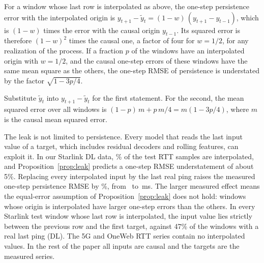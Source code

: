 \begin{proposition}
\label{prop:leak}
For a window whose last row is interpolated as above, the one-step persistence error with the interpolated origin is $y_{t+1}-\tilde{y}_t=(1-w)\,(y_{t+1}-y_{t-1})$, which is $(1-w)$ times the error with the causal origin $y_{t-1}$. Its squared error is therefore $(1-w)^2$ times the causal one, a factor of four for $w=1/2$, for any realization of the process. If a fraction $p$ of the windows have an interpolated origin with $w=1/2$, and the causal one-step errors of these windows have the same mean square as the others, the one-step RMSE of persistence is understated by the factor $\sqrt{1-3p/4}$.
\end{proposition}
\begin{IEEEproof}
Substitute $\tilde{y}_t$ into $y_{t+1}-\tilde{y}_t$ for the first statement. For the second, the mean squared error over all windows is $(1-p)\,m+p\,m/4=m(1-3p/4)$, where $m$ is the causal mean squared error.
\end{IEEEproof}

The leak is not limited to persistence. Every model that reads the last input value of a target, which includes residual decoders and rolling features, can exploit it. In our Starlink DL data, \InterpFracSLDL\% of the test RTT samples are interpolated, and Proposition~\ref{prop:leak} predicts a one-step RMSE understatement of about 5\%. Replacing every interpolated input by the last real ping raises the measured one-step persistence RMSE by \AuditPersHonePct\%, from \AuditPersLegacyHone\ to \AuditPersCausalHone\,ms. The larger measured effect means the equal-error assumption of Proposition~\ref{prop:leak} does not hold: windows whose origin is interpolated have larger one-step errors than the others. In every Starlink test window whose last row is interpolated, the input value lies strictly between the previous row and the first target, against 47\% of the windows with a real last ping (DL). The 5G and OneWeb RTT series contain no interpolated values. In the rest of the paper all inputs are causal and the targets are the measured series.
